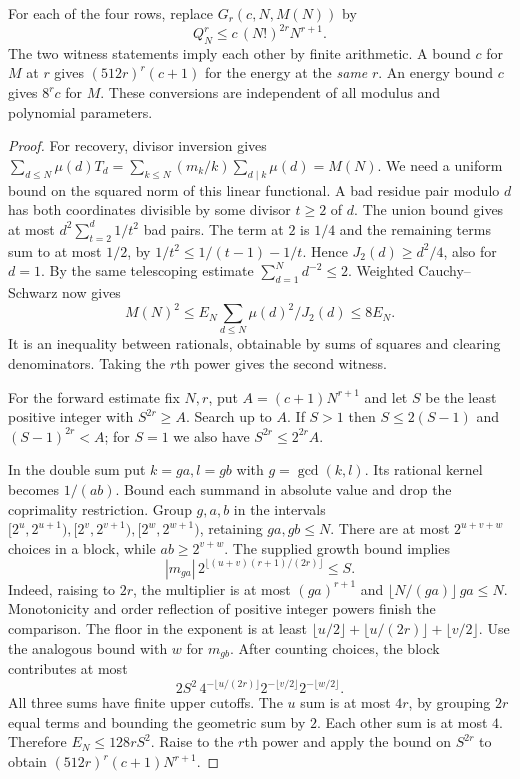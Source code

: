 \begin{theorem}\label{thm:energy}
For each of the four rows, replace $G_r(c,N,M(N))$ by
\[
             Q_N^r\le c\,(N!)^{2r}N^{r+1}.
\]
The two witness statements imply each other by finite arithmetic. A bound $c$ for $M$ at $r$ gives $(512r)^r(c+1)$ for the energy at the \emph{same} $r$. An energy bound $c$ gives $8^r c$ for $M$. These conversions are independent of all modulus and polynomial parameters.
\end{theorem}
\begin{proof}
For recovery, divisor inversion gives
$\sum_{d\le N}\mu(d)T_d=\sum_{k\le N}(m_k/k)\sum_{d\mid k}\mu(d)=M(N)$.
We need a uniform bound on the squared norm of this linear functional. A bad residue pair modulo $d$ has both coordinates divisible by some divisor $t\ge2$ of $d$. The union bound gives at most $d^2\sum_{t=2}^d 1/t^2$ bad pairs. The term at $2$ is $1/4$ and the remaining terms sum to at most $1/2$, by $1/t^2\le1/(t-1)-1/t$. Hence $J_2(d)\ge d^2/4$, also for $d=1$. By the same telescoping estimate $\sum_{d=1}^N d^{-2}\le2$. Weighted Cauchy--Schwarz now gives
\[
       M(N)^2\le E_N\sum_{d\le N}\mu(d)^2/J_2(d)\le 8E_N .
\]
It is an inequality between rationals, obtainable by sums of squares and clearing denominators. Taking the $r$th power gives the second witness.

For the forward estimate fix $N,r$, put $A=(c+1)N^{r+1}$ and let $S$ be the least positive integer with $S^{2r}\ge A$. Search up to $A$. If $S>1$ then $S\le2(S-1)$ and $(S-1)^{2r}<A$; for $S=1$ we also have $S^{2r}\le 2^{2r}A$.

In the double sum put $k=ga,l=gb$ with $g=\gcd(k,l)$. Its rational kernel becomes $1/(ab)$. Bound each summand in absolute value and drop the coprimality restriction. Group $g,a,b$ in the intervals $[2^u,2^{u+1}),[2^v,2^{v+1}),[2^w,2^{w+1})$, retaining $ga,gb\le N$. There are at most $2^{u+v+w}$ choices in a block, while $ab\ge2^{v+w}$. The supplied growth bound implies
\[
 |m_{ga}|\,2^{\lfloor(u+v)(r+1)/(2r)\rfloor}\le S.
\]
Indeed, raising to $2r$, the multiplier is at most $(ga)^{r+1}$ and $\lfloor N/(ga)\rfloor\,ga\le N$. Monotonicity and order reflection of positive integer powers finish the comparison. The floor in the exponent is at least
$\lfloor u/2\rfloor+\lfloor u/(2r)\rfloor+\lfloor v/2\rfloor$. Use the analogous bound with $w$ for $m_{gb}$. After counting choices, the block contributes at most
\[
 2 S^2\,4^{-\lfloor u/(2r)\rfloor}
            2^{-\lfloor v/2\rfloor}2^{-\lfloor w/2\rfloor}.
\]
All three sums have finite upper cutoffs. The $u$ sum is at most $4r$, by grouping $2r$ equal terms and bounding the geometric sum by $2$. Each other sum is at most $4$. Therefore $E_N\le128rS^2$. Raise to the $r$th power and apply the bound on $S^{2r}$ to obtain $(512r)^r(c+1)N^{r+1}$.


\end{proof}
